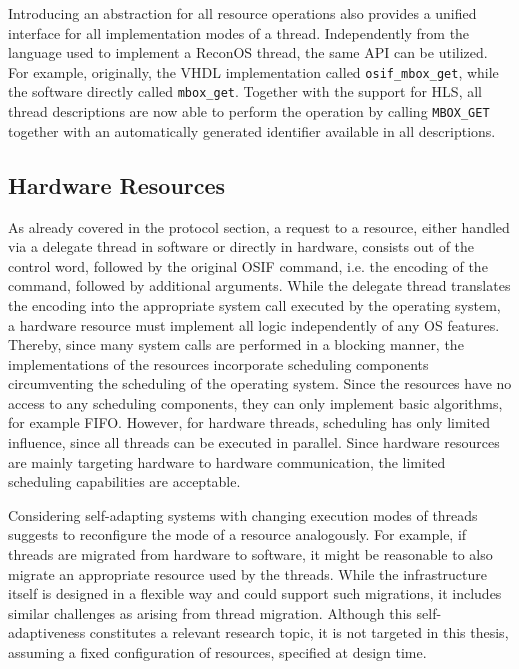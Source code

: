Introducing an abstraction for all resource operations also provides a unified
interface for all implementation modes of a thread. Independently from the
language used to implement a ReconOS thread, the same \ac{API} can be
utilized. For example, originally, the \ac{VHDL} implementation called
\lstinline{osif_mbox_get}, while the software directly called
\lstinline{mbox_get}. Together with the support for \ac{HLS}, all thread
descriptions are now able to perform the operation by calling
\lstinline{MBOX_GET} together with an automatically generated identifier
available in all descriptions.

\subsection{Hardware Resources}
As already covered in the protocol section, a request to a resource, either
handled via a delegate thread in software or directly in hardware, consists
out of the control word, followed by the original \ac{OSIF} command, i.e. the
encoding of the command, followed by additional arguments. While the delegate
thread translates the encoding into the appropriate system call executed by
the operating system, a hardware resource must implement all logic
independently of any \ac{OS} features. Thereby, since many system calls are
performed in a blocking manner, the implementations of the resources
incorporate scheduling components circumventing the scheduling of the
operating system. Since the resources have no access to any scheduling
components, they can only implement basic algorithms, for example \acl{FIFO}.
However, for hardware threads, scheduling has only limited influence, since
all threads can be executed in parallel. Since hardware resources are mainly
targeting hardware to hardware communication, the limited scheduling
capabilities are acceptable.

Considering self-adapting systems with changing execution modes of threads
suggests to reconfigure the mode of a resource analogously. For example, if
threads are migrated from hardware to software, it might be reasonable to also
migrate an appropriate resource used by the threads. While the infrastructure
itself is designed in a flexible way and could support such migrations, it
includes similar challenges as arising from thread migration. Although this
self-adaptiveness constitutes a relevant research topic, it is not targeted in
this thesis, assuming a fixed configuration of resources, specified at design
time.

